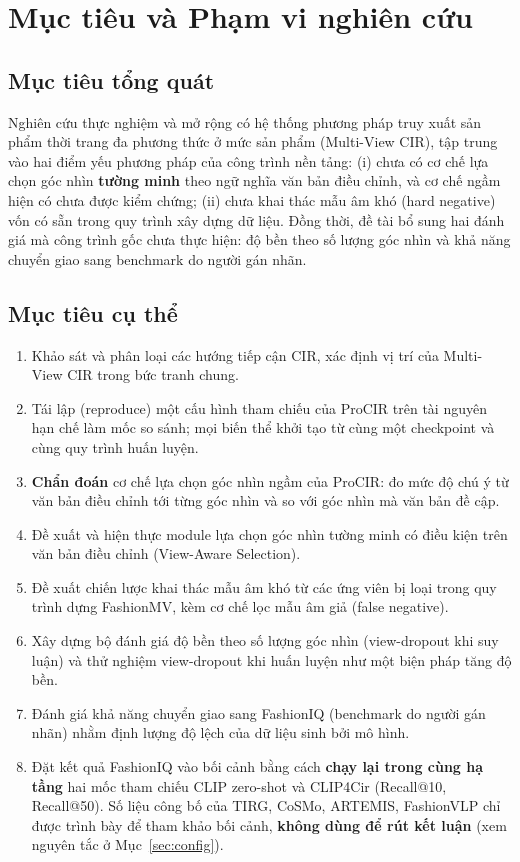 \documentclass[a4paper]{article}
\begin{document}
\section{Mục tiêu và Phạm vi nghiên cứu}

\subsection{Mục tiêu tổng quát}
Nghiên cứu thực nghiệm và mở rộng có hệ thống phương pháp truy xuất sản phẩm thời trang đa phương thức ở mức sản phẩm (Multi-View CIR), tập trung vào hai điểm yếu phương pháp của công trình nền tảng: (i) chưa có cơ chế lựa chọn góc nhìn \textbf{tường minh} theo ngữ nghĩa văn bản điều chỉnh, và cơ chế ngầm hiện có chưa được kiểm chứng; (ii) chưa khai thác mẫu âm khó (hard negative) vốn có sẵn trong quy trình xây dựng dữ liệu. Đồng thời, đề tài bổ sung hai đánh giá mà công trình gốc chưa thực hiện: độ bền theo số lượng góc nhìn và khả năng chuyển giao sang benchmark do người gán nhãn.

\subsection{Mục tiêu cụ thể}
\begin{enumerate}[label=(\alph*)]
\item Khảo sát và phân loại các hướng tiếp cận CIR, xác định vị trí của Multi-View CIR trong bức tranh chung.
\item Tái lập (reproduce) một cấu hình tham chiếu của ProCIR trên tài nguyên hạn chế làm mốc so sánh; mọi biến thể khởi tạo từ cùng một checkpoint và cùng quy trình huấn luyện.
\item \textbf{Chẩn đoán} cơ chế lựa chọn góc nhìn ngầm của ProCIR: đo mức độ chú ý từ văn bản điều chỉnh tới từng góc nhìn và so với góc nhìn mà văn bản đề cập.
\item Đề xuất và hiện thực module lựa chọn góc nhìn tường minh có điều kiện trên văn bản điều chỉnh (View-Aware Selection).
\item Đề xuất chiến lược khai thác mẫu âm khó từ các ứng viên bị loại trong quy trình dựng FashionMV, kèm cơ chế lọc mẫu âm giả (false negative).
\item Xây dựng bộ đánh giá độ bền theo số lượng góc nhìn (view-dropout khi suy luận) và thử nghiệm view-dropout khi huấn luyện như một biện pháp tăng độ bền.
\item Đánh giá khả năng chuyển giao sang FashionIQ (benchmark do người gán nhãn) nhằm định lượng độ lệch của dữ liệu sinh bởi mô hình.
\item Đặt kết quả FashionIQ vào bối cảnh bằng cách \textbf{chạy lại trong cùng hạ tầng} hai mốc tham chiếu CLIP zero-shot và CLIP4Cir (Recall@10, Recall@50). Số liệu công bố của TIRG, CoSMo, ARTEMIS, FashionVLP chỉ được trình bày để tham khảo bối cảnh, \textbf{không dùng để rút kết luận} (xem nguyên tắc ở Mục~\ref{sec:config}).
\end{enumerate}
\end{document}
